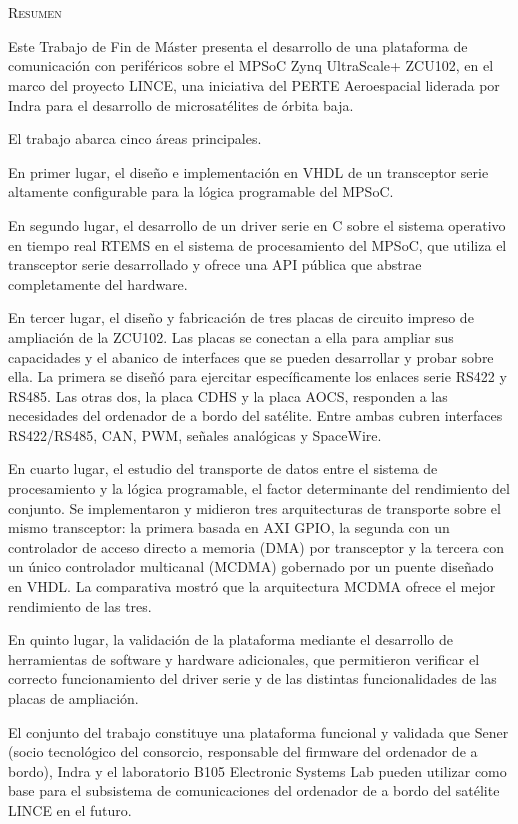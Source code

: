 \chapter*{}
\Large{\textsc{\textcolor{nar}{Resumen}}} \par
\vspace{0.2cm}
\normalsize{%
Este Trabajo de Fin de Máster presenta el desarrollo de una plataforma de comunicación con
periféricos sobre el MPSoC Zynq UltraScale+ ZCU102, en el marco del proyecto LINCE, una
iniciativa del PERTE Aeroespacial liderada por Indra para el desarrollo de microsatélites de
órbita baja.

El trabajo abarca cinco áreas principales.

En primer lugar, el diseño e implementación en VHDL de un transceptor serie altamente configurable para 
la lógica programable del MPSoC.

En segundo lugar, el desarrollo de un driver serie en C sobre el sistema operativo en tiempo real RTEMS 
en el sistema de procesamiento del MPSoC, que utiliza el transceptor serie desarrollado y ofrece una 
API pública que abstrae completamente del hardware.

En tercer lugar, el diseño y fabricación de tres placas de circuito impreso de ampliación de la ZCU102.
Las placas se conectan a ella para ampliar sus capacidades y el abanico de interfaces que se
pueden desarrollar y probar sobre ella.
La primera se diseñó para ejercitar específicamente los enlaces serie RS422 y RS485. Las otras
dos, la placa CDHS y la placa AOCS, responden a las necesidades del ordenador de a bordo del
satélite. Entre ambas cubren interfaces RS422/RS485, CAN, PWM, señales analógicas y SpaceWire.

En cuarto lugar, el estudio del transporte de datos entre el sistema de procesamiento y la lógica
programable, el factor determinante del rendimiento del conjunto. Se implementaron y midieron tres
arquitecturas de transporte sobre el mismo transceptor: la primera basada en AXI GPIO, la segunda
con un controlador de acceso directo a memoria (DMA) por transceptor y la tercera con un único
controlador multicanal (MCDMA) gobernado por un puente diseñado en VHDL. La comparativa mostró que
la arquitectura MCDMA ofrece el mejor rendimiento de las tres.

En quinto lugar, la validación de la plataforma mediante el desarrollo de herramientas de software
y hardware adicionales, que permitieron verificar el correcto funcionamiento del driver serie
y de las distintas funcionalidades de las placas de ampliación.

El conjunto del trabajo constituye una plataforma funcional y validada que Sener (socio
tecnológico del consorcio, responsable del firmware del ordenador de a bordo), Indra y el
laboratorio B105 Electronic Systems Lab pueden utilizar como base para el subsistema de comunicaciones del
ordenador de a bordo del satélite LINCE en el futuro.
}

